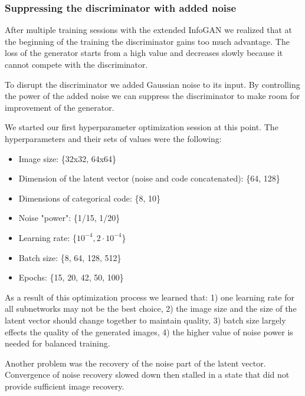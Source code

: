 \documentclass{egpubl}
\begin{document}
\subsubsection{Suppressing the discriminator with added noise}

After multiple training sessions with the extended InfoGAN we realized that at the beginning of the training the discriminator gains too much advantage. The loss of the generator starts from a high value and decreases slowly because it cannot compete with the discriminator.

To disrupt the discriminator we added Gaussian noise to its input. By controlling the power of the added noise we can suppress the discriminator to make room for improvement of the generator.







We started our first hyperparameter optimization session at this point. The hyperparameters and their sets of values were the following:


\begin{itemize}
	\item Image size: \{32x32, 64x64\}
	\item Dimension of the latent vector (noise and code concatenated): \{64, 128\}
	\item Dimensions of categorical code: \{8, 10\}
	\item Noise "power": \{1/15, 1/20\}
	\item Learning rate: \{$10^{-4}, 2 \cdot 10^{-4}$\}
	\item Batch size: \{8, 64, 128, 512\}
	\item Epochs: \{15, 20, 42, 50, 100\}
\end{itemize}

As a result of this optimization process we learned that: 1) one learning rate for all subnetworks may not be the best choice, 2) the image size and the size of the latent vector should change together to maintain quality, 3) batch size largely effects the quality of the generated images, 4) the higher value of noise power is needed for balanced training.

Another problem was the recovery of the noise part of the latent vector. Convergence of noise recovery slowed down then stalled in a state that did not provide sufficient image recovery.
\end{document}
